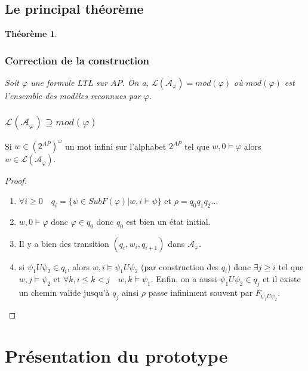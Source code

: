 \documentclass{beamer}
\theoremstyle{plain}
\newtheorem{thm}{Théorème}
\theoremstyle{definition}
\begin{document}
\subsection{Le principal théorème}
\begin{frame}
  \begin{thm}
    \frametitle{Correction de la construction}
    
    Soit $\varphi$ une formule LTL sur $AP$. On a, $\mathcal{L}(\mathcal{A}_\varphi)=mod(\varphi)$ où $mod(\varphi)$ est l'ensemble des modèles reconnues par $\varphi$.
  \end{thm}
\end{frame}

\begin{frame}
  \frametitle{$\mathcal{L}(\mathcal{A}_\varphi) \supseteq mod(\varphi)$}
  
  \begin{lemma}
    Si $w \in (2^{AP})^\omega$ un mot infini sur l'alphabet $2^{AP}$ tel que $w, 0 \models \varphi$
    alors $w \in \mathcal{L}(\mathcal{A}_\varphi)$.
  \end{lemma}

  \pause
  
  \begin{proof}
    \begin{enumerate}[<+->]
    \item $\forall i \geq 0 \quad q_i = \{ \psi \in SubF(\varphi) | w, i \models \psi\}$ et
      $\rho = q_0q_1q_2\dots$
    \item $w, 0 \models \varphi$ donc $\varphi \in q_0$ donc $q_0$ est bien un état initial.
    \item Il y a bien des transition $(q_i, w_i, q_{i+1})$ dans $\mathcal{A}_\varphi$.
    \item si $\psi_1 U \psi_2 \in q_i$, alors $w, i \models \psi_1 U \psi_2$ (par construction des $q_i$)
    donc $\exists j \geq i$ tel que $w,j \models \psi_2$ et $\forall k, i \leq k < j \quad w, k \models \psi_1$.
    Enfin, on a aussi $\psi_1 U \psi_2 \in q_j$ et il existe un chemin valide jusqu'à $q_j$ ainsi $\rho$ passe infiniment souvent par $F_{\psi_1 U \psi_2}$.
    \end{enumerate}    
  \end{proof}
\end{frame}

\section{Présentation du prototype}
\begin{frame}
  
\end{frame}
\end{document}
